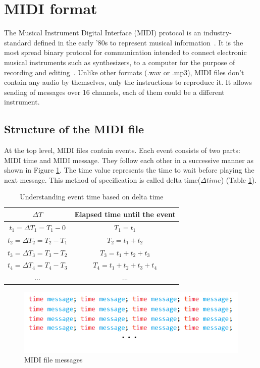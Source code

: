 \section{MIDI format}
The Musical Instrument Digital Interface (MIDI) protocol is an industry-standard defined in the early '80s to represent musical information~\cite{midi_history}. It is the most spread binary protocol for communication intended to connect electronic musical instruments such as synthesizers, to a computer for the purpose of recording and editing~\cite{midi_power}. Unlike other formats (.wav or .mp3), MIDI files don't contain any audio by themselves, only the instructions to reproduce it. It allows sending of messages over 16 channels, each of them could be a different instrument.

\subsection{Structure of the MIDI file}
At the top level, MIDI files contain events. Each event consists of two parts: MIDI time and MIDI message. They follow each other in a successive manner as shown in Figure \ref{fig:midi_messages}. The time value represents the time to wait before playing the next message. This method of specification is called delta time($\Delta time$) (Table \ref{table:midi_time}).

\begin{table} [H]
	\centering
	\caption{Understanding event time based on delta time}
	\begin{tabular}{ |c|c|} 
		\hline
		$\Delta T$ & Elapsed time until the event \\ \hline
		$t_1 = \Delta T_1 = T_1 - 0$ &  $T_1 = t_1$ \\ \hline
		$t_2 = \Delta T_2 = T_2 - T_1$ & $T_2 = t_1+t_2$\\ \hline
		$t_3 = \Delta T_3 = T_3 - T_2$ & $T_3 = t_1+t_2+t_3$ \\ \hline
		$t_4 = \Delta T_4 = T_4 - T_3$ & $T_4 = t_1+t_2+t_3+t_4$ \\ \hline
		... & ... \\ \hline						
	\end{tabular}
	\label{table:midi_time}
\end{table}

\begin{figure}[H]
	\caption[MIDI file messages]{ MIDI file messages }
	\centering
	\label{fig:midi_messages}
	\includegraphics[width=1\textwidth, height=0.9\textheight, keepaspectratio]{"resources/midi_messages"}
\end{figure}


